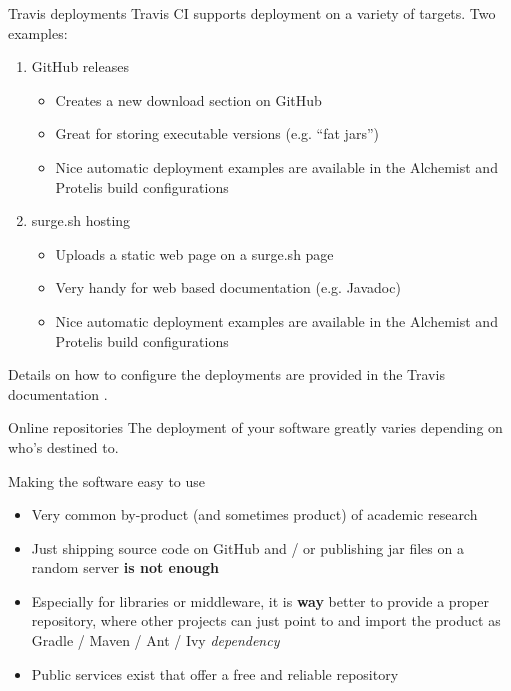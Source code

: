 \documentclass[presentation]{beamer}
\begin{document}
\begin{frame}{Travis deployments}
	Travis CI supports deployment on a variety of targets. Two examples:
	\begin{enumerate}
		\item GitHub releases
		\begin{itemize}
			\item Creates a new download section on GitHub
			\item Great for storing executable versions (e.g. ``fat jars'')
			\item Nice automatic deployment examples are available in the Alchemist \cite{alchemist-travis} and Protelis \cite{protelis-travis} build configurations
		\end{itemize}
		\item surge.sh hosting
		\begin{itemize}
			\item Uploads a static web page on a surge.sh page
			\item Very handy for web based documentation (e.g. Javadoc)
			\item Nice automatic deployment examples are available in the Alchemist \cite{alchemist-travis} and Protelis \cite{protelis-travis} build configurations
		\end{itemize}
	\end{enumerate}
	Details on how to configure the deployments are provided in the Travis documentation \cite{travisdeploy}.
\end{frame}


\begin{frame}[fragile]{Online repositories}
	The deployment of your software greatly varies depending on who's destined to.
	
	\begin{block}{Making the software easy to use}
		\begin{itemize}
			\item Very common by-product (and sometimes product) of academic research
			\item Just shipping source code on GitHub and / or publishing jar files on a random server \textbf{is not enough}
			\item Especially for libraries or middleware, it is \textbf{way} better to provide a proper repository, where other projects can just point to and import the product as Gradle / Maven / Ant / Ivy \textit{dependency}
			\item Public services exist that offer a free and reliable repository
		\end{itemize}
	\end{block}
\end{frame}
\end{document}
